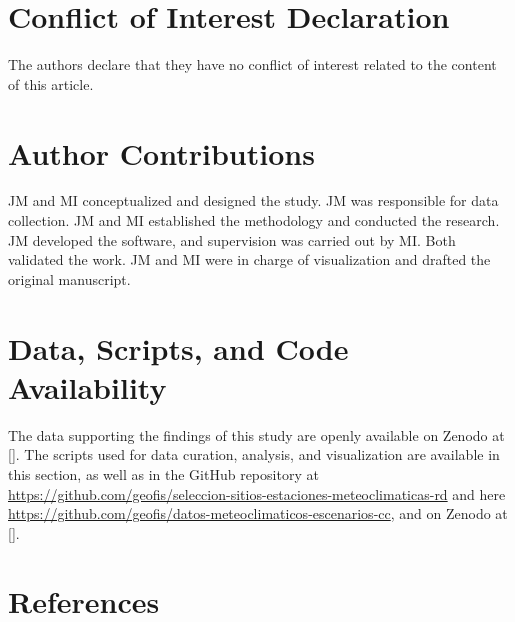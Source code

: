 \documentclass[spanish]{article}
\begin{document}
\hypertarget{conflict-of-interest-declaration}{%
\section*{Conflict of Interest
Declaration}\label{conflict-of-interest-declaration}}

The authors declare that they have no conflict of interest related to
the content of this article.

\hypertarget{author-contributions}{%
\section{Author Contributions}\label{author-contributions}}

JM and MI conceptualized and designed the study. JM was responsible for
data collection. JM and MI established the methodology and conducted the
research. JM developed the software, and supervision was carried out by
MI. Both validated the work. JM and MI were in charge of visualization
and drafted the original manuscript.

\hypertarget{data-scripts-and-code-availability}{%
\section*{Data, Scripts, and Code
Availability}\label{data-scripts-and-code-availability}}

The data supporting the findings of this study are openly available on
Zenodo at \url{} {[}{]}. The scripts used for data curation, analysis,
and visualization are available in this section, as well as in the
GitHub repository at
\url{https://github.com/geofis/seleccion-sitios-estaciones-meteoclimaticas-rd}
and here
\url{https://github.com/geofis/datos-meteoclimaticos-escenarios-cc}, and
on Zenodo at \url{} {[}{]}.

\newpage

\hypertarget{references}{%
\section*{References}\label{references}}
\end{document}
